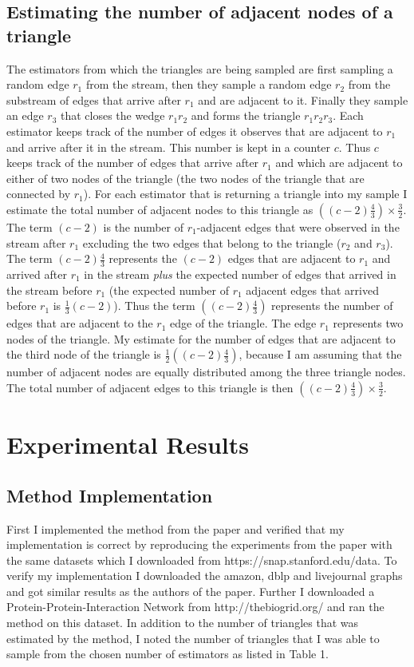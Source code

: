 \documentclass[12pt,twoside,a4paper]{report}
\begin{document}
\subsection{Estimating the number of adjacent nodes of a triangle}
The estimators from which the triangles are being sampled are first sampling a random edge $r_1$ from the stream, then they sample a random edge $r_2$ from the substream of edges that arrive after $r_1$ and are adjacent to it. Finally they sample an edge $r_3$ that closes the wedge $r_1r_2$ and forms the triangle $r_1r_2r_3$. Each estimator keeps track of the number of edges it observes that are adjacent to $r_1$ and arrive after it in the stream. This number is kept in a counter $c$. Thus $c$ keeps track of the number of edges that arrive after $r_1$ and which are adjacent to either of two nodes of the triangle (the two nodes of the triangle that are connected by $r_1$). For each estimator that is returning a triangle into my sample I estimate the total number of adjacent nodes to this triangle as $((c-2)\frac{4}{3})\times\frac{3}{2}$. The term $(c-2)$ is the number of $r_1$-adjacent edges that were observed in the stream after $r_1$ excluding the two edges that belong to the triangle ($r_2$ and $r_3$). The term $(c-2)\frac{4}{3}$ represents the $(c-2)$ edges that are adjacent to $r_1$ and arrived after $r_1$ in the stream \textit{plus} the expected number of edges that arrived in the stream before $r_1$ (the expected number of $r_1$ adjacent edges that arrived before $r_1$ is $\frac{1}{3}(c-2)$). Thus the term $((c-2)\frac{4}{3})$ represents the number of edges that are adjacent to the $r_1$ edge of the triangle. The edge $r_1$ represents two nodes of the triangle. My estimate for the number of edges that are adjacent to the third node of the triangle is $\frac{1}{2}((c-2)\frac{4}{3})$, because I am assuming that the number of adjacent nodes are equally distributed among the three triangle nodes. The total number of adjacent edges to this triangle is then $((c-2)\frac{4}{3})\times\frac{3}{2}$.
\section{Experimental Results}
\subsection{Method Implementation}
First I implemented the method from the paper and verified that my implementation is correct by reproducing the experiments from the paper with the same datasets which I downloaded from https://snap.stanford.edu/data. To verify my implementation I downloaded the amazon, dblp and livejournal graphs and got similar results as the authors of the paper. Further I downloaded a Protein-Protein-Interaction Network from http://thebiogrid.org/ and ran the method on this dataset. In addition to the number of triangles that was estimated by the method, I noted the number of triangles that I was able to sample from the chosen number of estimators as listed in Table 1. 
\end{document}
